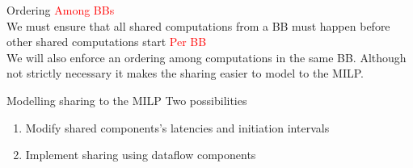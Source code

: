 \documentclass{beamer}
\renewcommand{\emph}{\textcolor{red}}
\begin{document}



\begin{frame}{Ordering}
\emph{Among BBs} \\
We must ensure that all shared computations from a BB must happen before other shared computations start \newline \newline
\emph{Per BB} \\
We will also enforce an ordering among computations in the same BB. Although not strictly necessary it makes the sharing easier to model to the MILP.
\end{frame}

\begin{frame}{Modelling sharing to the MILP}
Two possibilities
\begin{enumerate}
    \item Modify shared components's latencies and initiation intervals
    \item Implement sharing using dataflow components
\end{enumerate}
\end{frame}
\end{document}
